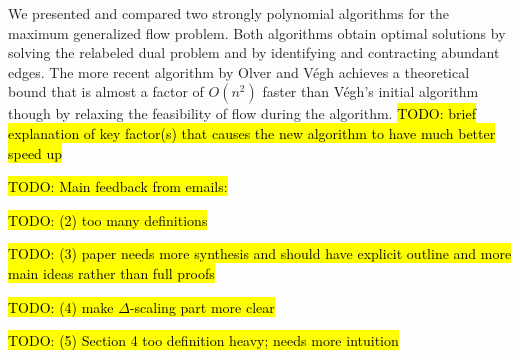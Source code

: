 \documentclass[11pt]{article}
\theoremstyle{definition}
\theoremstyle{definition}
\theoremstyle{definition}
\renewcommand{\todo}[1]{\hl{TODO: #1}}
\begin{document}
We presented and compared two strongly polynomial algorithms for the maximum generalized flow problem. Both algorithms obtain optimal solutions by solving the relabeled dual problem and by identifying and contracting abundant edges. The more recent algorithm by Olver and Végh achieves a theoretical bound that is almost a factor of $O(n^2)$ faster than Végh's initial algorithm though by relaxing the feasibility of flow during the algorithm. \todo{brief explanation of key factor(s) that causes the new algorithm to have much better speed up}



    
    \vspace{10mm}
\todo{Main feedback from emails:} 

\todo{(2) too many definitions}

\todo{(3) paper needs more synthesis and should have explicit outline and more main ideas rather than full proofs}

\todo{(4) make $\Delta$-scaling part more clear}

\todo{(5) Section 4 too definition heavy; needs more intuition}


\setlength{\bibitemsep}{0pt}
\nocite{*}
\printbibliography
\end{document}
